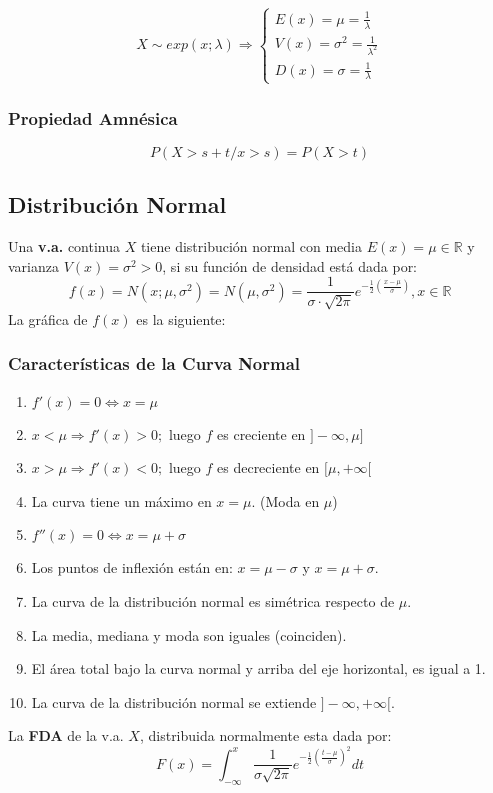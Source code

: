 $$
X\sim exp(x;\lambda)\Rightarrow
\begin{cases}
E(x) = \mu = \frac{1}{\lambda} \\
V(x) = \sigma^2 = \frac{1}{\lambda^2} \\
D(x) = \sigma = \frac{1}{\lambda}
\end{cases}
$$
\subsubsection{Propiedad Amnésica}
$$P(X>s+t / x> s)=P(X>t)$$

\subsection{Distribución Normal}
Una \textbf{v.a.} continua $X$ tiene distribución normal con media $E(x)=\mu \in \mathbb{R}$ y varianza $V(x)=\sigma^2 >0$, si su función de densidad está dada por:
$$
f(x) = N(x;\mu,\sigma^2)=N(\mu,\sigma^2)=\dfrac{1}{\sigma \cdot \sqrt{2\pi}}e^{-\frac{1}{2}(\frac{x-\mu}{\sigma})}, x\in \mathbb{R}
$$
La gráfica de $f(x)$ es la siguiente:



\subsubsection{Características de la Curva Normal}
\begin{enumerate}
\item $f'(x)=0\Leftrightarrow x=\mu$
\item $x<\mu \Rightarrow f'(x)>0;$ luego $f$ es creciente en $]-\infty,\mu]$
\item $x>\mu \Rightarrow f'(x)<0;$ luego $f$ es decreciente en $[\mu,+\infty[$
\item La curva tiene un máximo en $x=\mu$. (Moda en $\mu$)
\item $f''(x)=0 \Leftrightarrow x = \mu + \sigma$
\item Los puntos de inflexión están en: $x=\mu-\sigma$ y $x=\mu+\sigma$.
\item La curva de la distribución normal es simétrica respecto de $\mu$.
\item La media, mediana y moda son iguales (coinciden).
\item El área total bajo la curva normal y arriba del eje horizontal, es igual a 1.
\item La curva de la distribución normal se extiende $]-\infty,+\infty[$.
\end{enumerate}
La \textbf{FDA} de la v.a. $X$, distribuida normalmente esta dada por:
$$F(x)=
\displaystyle\int_{-\infty}^{x} \dfrac{1}{\sigma \sqrt{2\pi}} e^{-\frac{1}{2} (\frac{t-\mu}{\sigma})^2 } dt
$$

